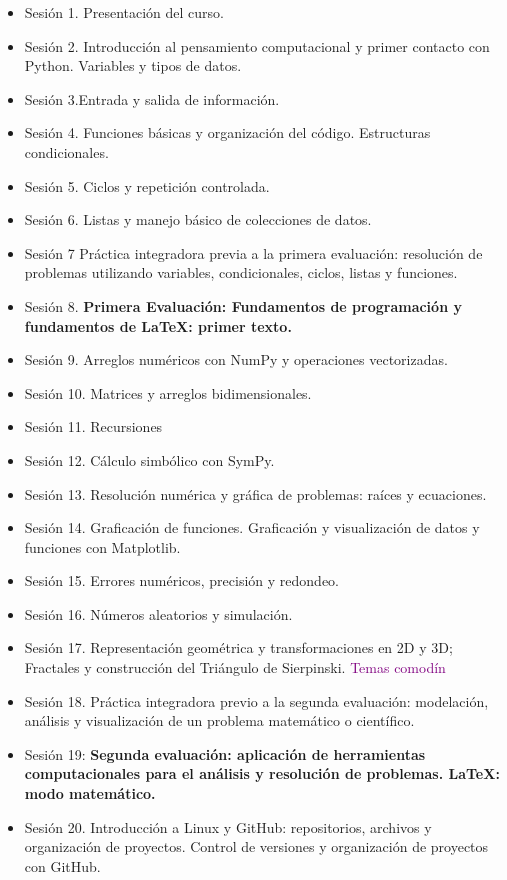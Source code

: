 \documentclass[12pt,letterpaper]{article}
\begin{document}
\begin{itemize}
    \item Sesión 1. Presentación del curso.
\item Sesión 2. Introducción al pensamiento computacional y primer contacto con Python. Variables y tipos de datos.
 \item Sesión 3.Entrada y salida de información.
 \item Sesión 4. Funciones básicas y organización del código. Estructuras condicionales.
 \item Sesión 5. Ciclos y repetición controlada. 
 \item Sesión 6. Listas y manejo básico de colecciones de datos.
  \item Sesión 7 Práctica integradora previa a la primera evaluación: resolución de problemas utilizando variables, condicionales, ciclos, listas y funciones.
\item Sesión 8. \textbf{ Primera Evaluación: Fundamentos de programación y fundamentos de LaTeX: primer texto.}
\item Sesión 9. Arreglos numéricos con NumPy y operaciones vectorizadas.
 \item Sesión 10. Matrices y arreglos bidimensionales.
 \item Sesión 11. Recursiones
 \item Sesión 12. Cálculo simbólico con SymPy.
 \item Sesión 13. Resolución numérica y gráfica de problemas: raíces y ecuaciones.
 \item Sesión 14. Graficación de funciones. Graficación y visualización de datos y funciones con Matplotlib.
 \item Sesión 15. Errores numéricos, precisión y redondeo.
 \item Sesión 16. Números aleatorios y simulación.
 \item Sesión 17. Representación geométrica y transformaciones en 2D y 3D; Fractales y construcción del Triángulo de Sierpinski. {\textcolor{purple}{Temas comodín}}

\item Sesión 18. Práctica integradora previo a la segunda evaluación: modelación, análisis y visualización de un problema matemático o científico.

\item Sesión 19: \textbf{ Segunda evaluación: aplicación de herramientas computacionales para el análisis y resolución de problemas. LaTeX: modo matemático.}
 \item Sesión 20. Introducción a Linux y GitHub: repositorios, archivos y organización de proyectos. Control de versiones y organización de proyectos con GitHub.


\end{itemize}
\end{document}
